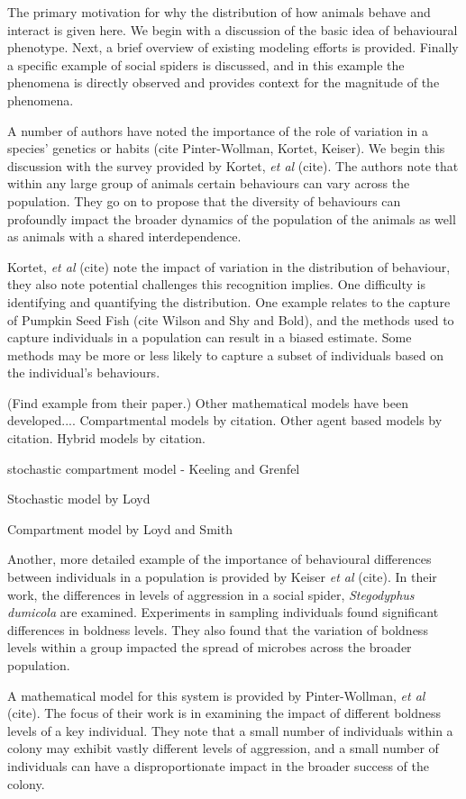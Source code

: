 \documentclass[12pt]{article}
\begin{document}
The primary motivation for why the distribution of how animals behave
and interact is given here. We begin with a discussion of the basic
idea of behavioural phenotype. Next, a brief overview of existing
modeling efforts is provided. Finally a specific example of social
spiders is discussed, and in this example the phenomena is directly
observed and provides context for the magnitude of the phenomena.

A number of authors have noted the importance of the role of variation
in a species' genetics or habits (cite Pinter-Wollman, Kortet,
Keiser). We begin this discussion with the survey provided by Kortet,
\textit{et al} (cite). The authors note that within any large group of
animals certain behaviours can vary across the population. They go on
to propose that the diversity of behaviours can profoundly impact the
broader dynamics of the population of the animals as well as animals
with a shared interdependence.

Kortet, \textit{et al} (cite) note the impact of variation in the
distribution of behaviour, they also note potential challenges this
recognition implies. One difficulty is identifying and quantifying the
distribution. One example relates to the capture of Pumpkin Seed Fish
(cite Wilson and Shy and Bold), and the methods used to capture
individuals in a population can result in a biased estimate.  Some
methods may be more or less likely to capture a subset of individuals
based on the individual's behaviours. 

(Find example from their paper.)  Other mathematical models have been
developed.... Compartmental models by citation. Other agent based
models by citation. Hybrid models by citation.

stochastic compartment model - Keeling and Grenfel

Stochastic model by Loyd

Compartment model by Loyd and Smith

Another, more detailed example of the importance of behavioural
differences between individuals in a population is provided by Keiser
\textit{et al} (cite). In their work, the differences in levels of
aggression in a social spider, \textit{Stegodyphus dumicola} are
examined. Experiments in sampling individuals found significant
differences in boldness levels. They also found that the variation of
boldness levels within a group impacted the spread of microbes across
the broader population.

A mathematical model for this system is provided by Pinter-Wollman,
\textit{et al} (cite). The focus of their work is in examining the
impact of different boldness levels of a key individual.  They note
that a small number of individuals within a colony may exhibit vastly
different levels of aggression, and a small number of individuals can
have a disproportionate impact in the broader success of the colony.
\end{document}
